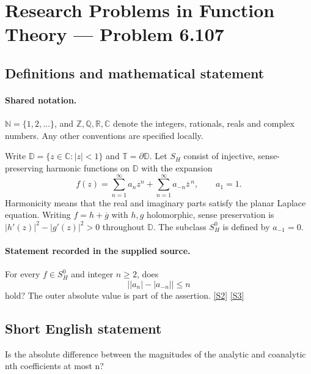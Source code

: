 \documentclass[11pt]{article}
\newcommand{\sref}[2]{\hyperlink{source:#1:#2}{[S#2]}}
\begin{document}
\section{Research Problems in Function Theory — Problem 6.107}\label{statement}

\subsection{Definitions and mathematical statement}

\paragraph{Shared notation.}$\mathbb N=\{1,2,\ldots\}$, and $\mathbb Z,\mathbb Q,\mathbb R,\mathbb C$ denote the integers, rationals, reals and complex numbers. Any other conventions are specified locally.


Write $\mathbb D=\{z\in\mathbb C:|z|<1\}$ and $\mathbb T=\partial\mathbb D$. Let $S_H$ consist of injective, sense-preserving harmonic functions on $\mathbb D$ with the expansion
\[f(z)=\sum_{n=1}^{\infty}a_nz^n+\sum_{n=1}^{\infty}a_{-n}\overline z^{\,n},\qquad a_1=1.\]
Harmonicity means that the real and imaginary parts satisfy the planar Laplace equation. Writing $f=h+\overline g$ with $h,g$ holomorphic, sense preservation is $|h'(z)|^2-|g'(z)|^2>0$ throughout $\mathbb D$. The subclass $S_H^0$ is defined by $a_{-1}=0$.

\paragraph{Statement recorded in the supplied source.}
For every $f\in S_H^0$ and integer $n\geq2$, does
\[\bigl||a_n|-|a_{-n}|\bigr|\leq n\]
hold? The outer absolute value is part of the assertion. \sref{statement}{2} \sref{statement}{3}
\subsection{Short English statement}
Is the absolute difference between the magnitudes of the analytic and coanalytic nth coefficients at most n?
\end{document}
